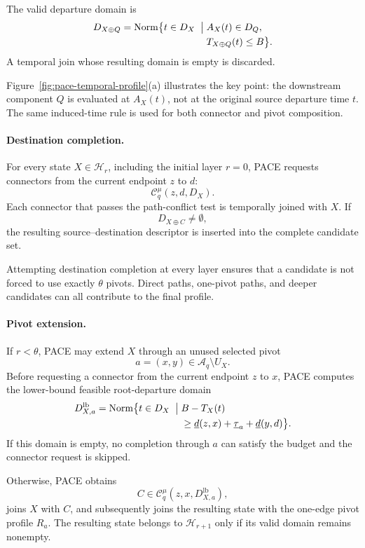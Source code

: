 \documentclass[a4paper,fleqn]{cas-dc}
\begin{document}
The valid departure domain is
\[
\begin{aligned}
D_{X\oplus Q}
=
\operatorname{Norm}\bigl\{t\in D_X\;\bigm|\;&
A_X(t)\in D_Q,\\[-0.2ex]
& T_{X\oplus Q}(t)\leq B
\bigr\}.
\end{aligned}
\]
A temporal join whose resulting domain is empty is discarded.

Figure~\ref{fig:pace-temporal-profile}(a) illustrates the key point: the
downstream component \(Q\) is evaluated at \(A_X(t)\), not at the original
source departure time \(t\). The same induced-time rule is used for both
connector and pivot composition.

\paragraph{Destination completion.}
For every state \(X\in\mathcal H_r\), including the initial layer \(r=0\),
PACE requests connectors from the current endpoint \(z\) to \(d\):
\[
\mathcal C_q^\mu(z,d,D_X).
\]
Each connector that passes the path-conflict test is temporally joined with
\(X\). If
\[
D_{X\oplus C}\neq\emptyset,
\]
the resulting source--destination descriptor is inserted into the complete
candidate set.

Attempting destination completion at every layer ensures that a candidate is
not forced to use exactly \(\theta\) pivots. Direct paths, one-pivot paths, and
deeper candidates can all contribute to the final profile.

\paragraph{Pivot extension.}
If \(r<\theta\), PACE may extend \(X\) through an unused selected pivot
\[
a=(x,y)\in\mathcal A_q\setminus U_X.
\]
Before requesting a connector from the current endpoint \(z\) to \(x\), PACE
computes the lower-bound feasible root-departure domain
\[
\begin{aligned}
D_{X,a}^{\mathrm{lb}}
=
\operatorname{Norm}\bigl\{t\in D_X\;\bigm|\;&
B-T_X(t)\\[-0.2ex]
&\geq \underline d(z,x)+\underline{\tau}_a+\underline d(y,d)
\bigr\}.
\end{aligned}
\]
If this domain is empty, no completion through \(a\) can satisfy the budget
and the connector request is skipped.

Otherwise, PACE obtains
\[
C\in
\mathcal C_q^\mu(z,x,D_{X,a}^{\mathrm{lb}}),
\]
joins \(X\) with \(C\), and subsequently joins the resulting state with the
one-edge pivot profile \(R_a\). The resulting state belongs to
\(\mathcal H_{r+1}\) only if its valid domain remains nonempty.
\end{document}
